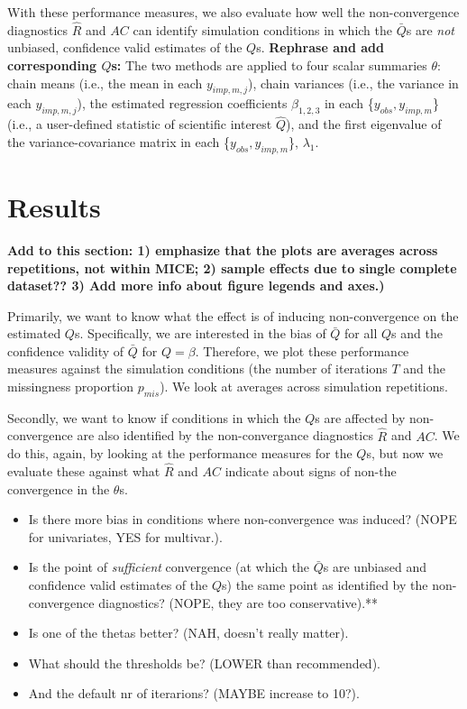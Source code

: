 \documentclass[Royal,times,sageh]{sagej}
\begin{document}
With these performance measures, we also evaluate how well the
non-convergence diagnostics \(\widehat{R}\) and \(AC\) can identify
simulation conditions in which the \(\bar{Q}\)s are \emph{not} unbiased,
confidence valid estimates of the \(Q\)s. \textbf{Rephrase and add
corresponding \(Q\)s:} The two methods are applied to four scalar
summaries \(\theta\): chain means (i.e., the mean in each
\(y_{imp, m, j}\)), chain variances (i.e., the variance in each
\(y_{imp, m, j}\)), the estimated regression coefficients
\(\beta_{1,2,3}\) in each \{\(y_{obs}, y_{imp, m}\)\} (i.e., a
user-defined statistic of scientific interest \(\hat{Q}\)), and the
first eigenvalue of the variance-covariance matrix in each
\{\(y_{obs}, y_{imp, m}\)\}, \(\lambda_1\).

\hypertarget{results}{%
\section{Results}\label{results}}

\textbf{Add to this section: 1) emphasize that the plots are averages
across repetitions, not within MICE; 2) sample effects due to single
complete dataset?? 3) Add more info about figure legends and axes.)}

Primarily, we want to know what the effect is of inducing
non-convergence on the estimated \(Q\)s. Specifically, we are interested
in the bias of \(\bar{Q}\) for all \(Q\)s and the confidence validity of
\(\bar{Q}\) for \(Q=\beta\). Therefore, we plot these performance
measures against the simulation conditions (the number of iterations
\(T\) and the missingness proportion \(p_{mis}\)). We look at averages
across simulation repetitions.

Secondly, we want to know if conditions in which the \(Q\)s are affected
by non-convergence are also identified by the non-convergance
diagnostics \(\widehat{R}\) and \(AC\). We do this, again, by looking at
the performance measures for the \(Q\)s, but now we evaluate these
against what \(\widehat{R}\) and \(AC\) indicate about signs of non-the
convergence in the \(\theta\)s.

\begin{itemize}
\item
  Is there more bias in conditions where non-convergence was induced?
  (NOPE for univariates, YES for multivar.).
\item
  Is the point of \emph{sufficient} convergence (at which the
  \(\bar{Q}\)s are unbiased and confidence valid estimates of the
  \(Q\)s) the same point as identified by the non-convergence
  diagnostics? (NOPE, they are too conservative).**
\item
  Is one of the thetas better? (NAH, doesn't really matter).
\item
  What should the thresholds be? (LOWER than recommended).
\item
  And the default nr of iterarions? (MAYBE increase to 10?).
\end{itemize}
\end{document}
